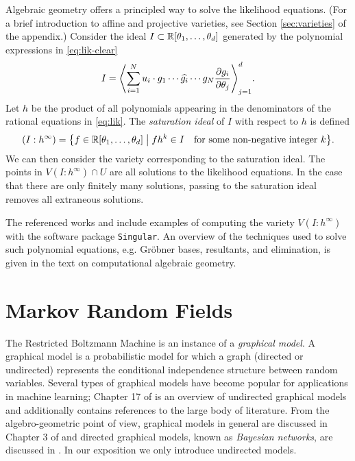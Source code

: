 \documentclass[cclicense]{hmcthesis}
\numberwithin{equation}{chapter}
\numberwithin{thmcounter}{chapter}
\begin{document}
    Algebraic geometry offers a principled way to solve the likelihood
    equations.  (For a brief introduction to affine and projective varieties, see
    Section \ref{sec:varieties} of the appendix.)  Consider the ideal $I \subset \R[\theta_1,
    \ldots, \theta_d]$ generated by the polynomial expressions in \eqref{eq:lik-clear}
    \[
        I = \adel[\Bigg]{
            \sum_{i=1}^N u_i \cdot g_1 \cdots \widehat{g_i} \cdots g_N
            \frac{\partial g_i}{\partial \theta_j}
        }_{j=1}^d
        .
    \]
    Let $h$ be the product of all polynomials appearing in the denominators of
    the rational equations in \eqref{eq:lik}.  The \emph{saturation ideal} of
    $I$ with respect to $h$ is defined
    \[
        (I : h^\infty) = \cdel[\big]{
            f \in \R[\theta_1, \ldots, \theta_d]
            \;\big\vert\;
            fh^k \in I
            \quad
            \text{for some non-negative integer $k$}
        }.
    \]
    We can then consider the variety corresponding to the saturation ideal.  The
    points in $V(I : h^\infty) \cap U$ are all solutions to the likelihood
    equations.  In the case that there are only finitely many solutions, passing
    to the saturation ideal removes all extraneous solutions.

    The referenced works \citep{ASCB} and \citep{DSS08} include examples of
    computing the variety $V(I : h^\infty)$ with the software package
    \texttt{Singular}.  An overview of the techniques used to solve such
    polynomial equations, e.g. Gröbner bases, resultants, and elimination, is
    given in the text \citep{CLO05} on computational algebraic geometry.

\section{Markov Random Fields}
    \label{sec:rbm-def}

    The Restricted Boltzmann Machine is an instance of a \emph{graphical model}.
    A graphical model is a probabilistic model for which a graph (directed or
    undirected) represents the conditional independence structure between random
    variables.  Several types of graphical models have become popular for
    applications in machine learning; Chapter 17 of \citep{EOSL} is an overview
    of undirected graphical models and additionally contains references to the
    large body of literature.  From the algebro-geometric point of view,
    graphical models in general are discussed in Chapter 3 of \citep{DSS08} and
    directed graphical models, known as \emph{Bayesian networks}, are discussed
    in \citep{GSS}.  In our exposition we only introduce undirected models.
\end{document}
